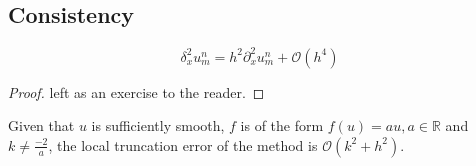 \subsection{Consistency}

\begin{lemma}
    \label{central_difference}
    $$\delta_x^2u_{m}^{n} = h^2\partial_x^2 u_{m}^{n} + \mathcal{O}(h^4)$$
\end{lemma}
\begin{proof}
    left as an exercise to the reader.
\end{proof}

\begin{theorem}
    \label{consistent}
    Given that $u$ is sufficiently smooth,  $f$ is of the form $f(u)=au, a\in \mathbb{R}$ and $k \neq \frac{-2}{a}$, the local truncation error of the method is $\mathcal{O}(k^2 + h^2).$
\end{theorem}

